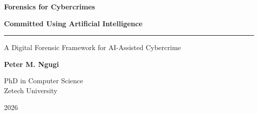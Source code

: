 \documentclass[aspectratio=169,11pt]{beamer}
\begin{document}
\begin{frame}[plain]
\begin{flushleft}
			{\fontsize{24}{28}\selectfont
				\bfseries
				\color{CyberBlue}
				Forensics for Cybercrimes
			}
			
			\vspace{0.1cm}
			
			{\fontsize{24}{28}\selectfont
				\bfseries
				\color{DarkText}
				Committed Using Artificial Intelligence
			}
			
			\vspace{0.35cm}
			
			{\color{CyberCyan}
				\rule{7cm}{2pt}
			}
			
			\vspace{0.4cm}
			
			{\large
				\color{MutedText}
				A Digital Forensic Framework for
				AI-Assisted Cybercrime
			}
			
			\vspace{0.8cm}
			
			{\large
				\color{DarkText}
				\textbf{Peter M. Ngugi}
			}
			
			\vspace{0.15cm}
			
			{\small
				\color{MutedText}
				PhD in Computer Science\\
				Zetech University
			}
			
			\vspace{0.15cm}
			
			{\small
				\color{MutedText}
				2026
			}
			
		\end{flushleft}
		
	\end{frame}
	
	
\end{document}
